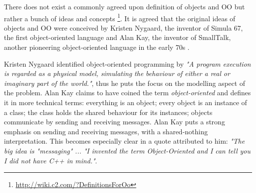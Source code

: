\medskip

There does not exist a commonly agreed upon definition of objects and OO but rather a bunch of ideas and concepts \footnote{\url{http://wiki.c2.com/?DefinitionsForOo}}. It is agreed that the original ideas of objects and OO were conceived by Kristen Nygaard, the inventor of Simula 67, the first object-oriented language \cite{dahl_birth_2002} and Alan Kay, the inventor of SmallTalk, another pioneering object-oriented language in the early 70s \cite{kay_early_1993}. %

Kristen Nygaard identified object-oriented programming by \textit{"A program execution is regarded as a physical model, simulating the behaviour of either a real or imaginary part of the world."}, thus he puts the focus on the modelling aspect of the problem. Alan Kay claims to have coined the term \textit{object-oriented} and defines it in more technical terms: everything is an object; every object is an instance of a class; the class holds the shared behaviour for its instances; objects communicate by sending and receiving messages. Alan Kay puts a strong emphasis on sending and receiving messages, with a shared-nothing interpretation. This becomes especially clear in a quote attributed to him: \textit{"The big idea is "messaging" ... "I invented the term Object-Oriented and I can tell you I did not have C++ in mind."}.

\medskip


